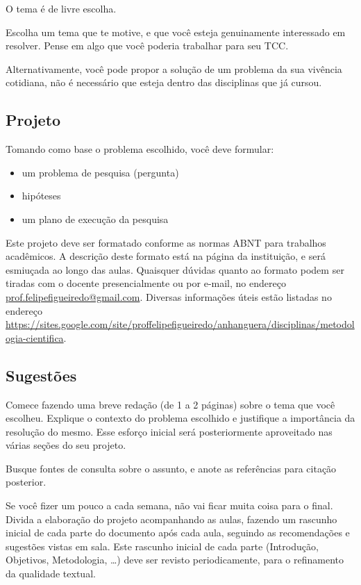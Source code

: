 \documentclass[a4paper]{article}
\begin{document}
O tema é de livre escolha.

Escolha um tema que te motive, e que você esteja genuinamente interessado em resolver.
Pense em algo que você poderia trabalhar para seu TCC.

Alternativamente, você pode propor a solução de um problema da sua vivência cotidiana, não é necessário que esteja dentro das disciplinas que já cursou.

\subsection{Projeto}

Tomando como base o problema escolhido, você deve formular:

\begin{itemize}
\item um problema de pesquisa (pergunta)
\item hipóteses
\item um plano de execução da pesquisa
\end{itemize}

Este projeto deve ser formatado conforme as normas ABNT para trabalhos acadêmicos.
A descrição deste formato está na página da instituição, e será esmiuçada ao longo das aulas.
Quaisquer dúvidas quanto ao formato podem ser tiradas com o docente presencialmente ou por e-mail, no endereço \url{prof.felipefigueiredo@gmail.com}.
Diversas informações úteis estão listadas no endereço \url{https://sites.google.com/site/proffelipefigueiredo/anhanguera/disciplinas/metodologia-cientifica}.

\subsection{Sugestões}

Comece fazendo uma breve redação (de 1 a 2 páginas) sobre o tema que você escolheu.
Explique o contexto do problema escolhido e justifique a importância da resolução do mesmo.
Esse esforço inicial será posteriormente aproveitado nas várias seções do seu projeto.

Busque fontes de consulta sobre o assunto, e anote as referências para citação posterior.

Se você fizer um pouco a cada semana, não vai ficar muita coisa para o final.
Divida a elaboração do projeto acompanhando as aulas, fazendo um rascunho inicial de cada parte do documento após cada aula, seguindo as recomendações e sugestões vistas em sala.
Este rascunho inicial de cada parte (Introdução, Objetivos, Metodologia, \ldots) deve ser revisto periodicamente, para o refinamento da qualidade textual.
\end{document}
